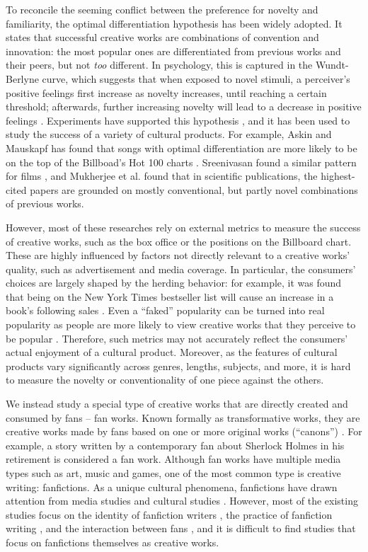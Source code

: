 \documentclass[a4paper]{article}
\begin{document}
To reconcile the seeming conflict between the preference for novelty and familiarity, the optimal differentiation hypothesis has been widely adopted. It states that successful creative works are combinations of convention and innovation: the most popular ones are differentiated from previous works and their peers, but not \emph{too} different. In psychology, this is captured in the Wundt-Berlyne curve, which suggests that when exposed to novel stimuli, a perceiver's positive feelings first increase as novelty increases, until reaching a certain threshold; afterwards, further increasing novelty will lead to a decrease in positive feelings \cite{berlyne1970novelty}. Experiments have supported this hypothesis \cite{hargreaves1984effects} \cite{sluckin1980liking}, and it has been used to study the success of a variety of cultural products. For example, Askin and Mauskapf has found that songs with optimal differentiation are more likely to be on the top of the Billboad's Hot 100 charts \cite{askin2017makes}. Sreenivasan found a similar pattern for films \cite{sreenivasan2013quantitative}, and Mukherjee et al. found that in scientific publications, the highest-cited papers are grounded on mostly conventional, but partly novel combinations of previous works. 

However, most of these researches rely on external metrics to measure the success of creative works, such as the box office or the positions on the Billboard chart. These are highly influenced by factors not directly relevant to a creative works' quality, such as advertisement and media coverage. In particular, the consumers' choices are largely shaped by the herding behavior: for example, it was found that being on the New York Times bestseller list will cause an increase in a book's following sales \cite{sorensen2007bestseller}.  Even a ``faked'' popularity can be turned into real popularity as people are more likely to view creative works that they perceive to be popular \cite{salganik2008leading}. Therefore, such metrics may not accurately reflect the consumers' actual enjoyment of a cultural product. Moreover, as the features of cultural products vary significantly across genres, lengths, subjects, and more, it is hard to measure the novelty or conventionality of one piece against the others. 

We instead study a special type of creative works that are directly created and consumed by fans -- fan works. Known formally as transformative works, they are creative works made by fans based on one or more original works (``canons'') \cite{wiki:transf_work}. For example, a story written by a contemporary fan about Sherlock Holmes in his retirement is considered a fan work. Although fan works have multiple media types such as art, music and games, one of the most common type is creative writing: fanfictions. As a unique cultural phenomena, fanfictions have drawn attention from media studies and cultural studies \cite{thomas2011fanfiction}. However, most of the existing studies focus on the identity of fanfiction writers \cite{black2006language}, the practice of fanfiction writing \cite{LIT:LIT12061}, and the interaction between fans \cite{hills2015expertise}, and it is difficult to find studies that focus on fanfictions themselves as creative works.
\end{document}
